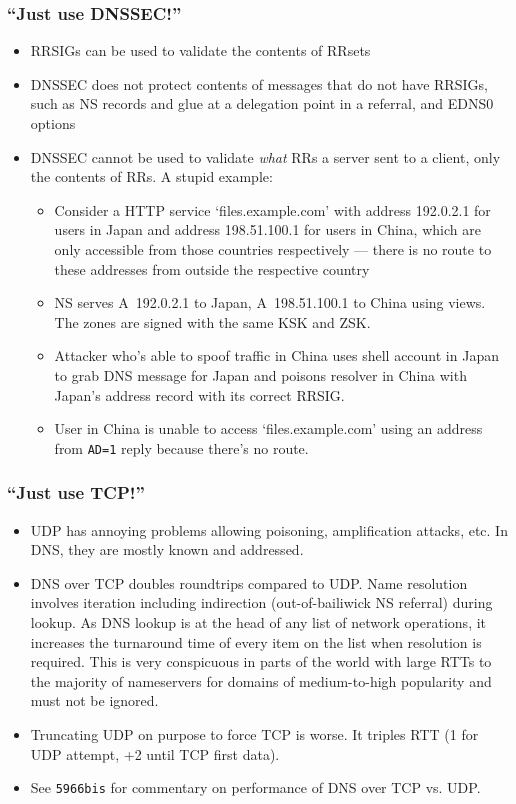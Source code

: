 \documentclass{beamer}
\begin{document}
\frame
{
  \frametitle{``Just use DNSSEC!''}

  \begin{itemize}
  \item RRSIGs can be used to validate the contents of RRsets
  \item DNSSEC does not protect contents of messages that do not have
    RRSIGs, such as NS records and glue at a delegation point in a
    referral, and EDNS0 options
  \item DNSSEC cannot be used to validate {\em what} RRs a server sent
    to a client, only the contents of RRs. A stupid example:
    \begin{itemize}
    \item Consider a HTTP service `files.example.com' with address
      192.0.2.1 for users in Japan and address 198.51.100.1 for users in
      China, which are only accessible from those countries respectively
      --- there is no route to these addresses from outside the
      respective country
    \item NS serves A~192.0.2.1 to Japan, A~198.51.100.1 to China
      using views. The zones are signed with the same KSK and ZSK.
    \item Attacker who's able to spoof traffic in China uses shell
      account in Japan to grab DNS message for Japan and poisons
      resolver in China with Japan's address record with its correct
      RRSIG.
    \item User in China is unable to access `files.example.com' using an
      address from \texttt{AD=1} reply because there's no route.
    \end{itemize}
  \end{itemize}
}

\frame
{
  \frametitle{``Just use TCP!''}

  \begin{itemize}
  \item UDP has annoying problems allowing poisoning, amplification
    attacks, etc. In DNS, they are mostly known and addressed.
  \item DNS over TCP doubles roundtrips compared to UDP. Name resolution
    involves iteration including indirection (out-of-bailiwick NS
    referral) during lookup. As DNS lookup is at the head of any list of
    network operations, it increases the turnaround time of every item
    on the list when resolution is required. This is very conspicuous in
    parts of the world with large RTTs to the majority of nameservers
    for domains of medium-to-high popularity and must not be ignored.
  \item Truncating UDP on purpose to force TCP is worse. It triples
    RTT (1 for UDP attempt, +2 until TCP first data).
  \item See \texttt{5966bis} for commentary on performance of DNS over
    TCP vs. UDP.
  \end{itemize}
}
\end{document}
